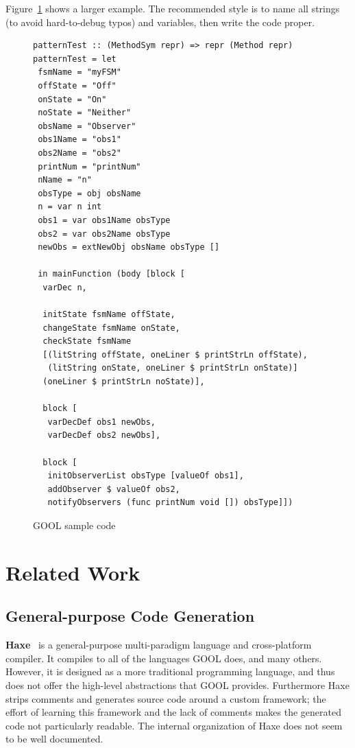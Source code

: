 \documentclass[sigplan,review,prologue,dvipsnames]{acmart}
\begin{document}
Figure~\ref{fig:code} shows a larger example.  The recommended style is
to name all strings (to avoid hard-to-debug typos) and variables, then
write the code proper.
\begin{figure}[tb]
\begin{lstlisting}
patternTest :: (MethodSym repr) => repr (Method repr)
patternTest = let 
 fsmName = "myFSM"
 offState = "Off"
 onState = "On"
 noState = "Neither"
 obsName = "Observer"
 obs1Name = "obs1"
 obs2Name = "obs2"
 printNum = "printNum"
 nName = "n"
 obsType = obj obsName
 n = var n int
 obs1 = var obs1Name obsType
 obs2 = var obs2Name obsType
 newObs = extNewObj obsName obsType []
   
 in mainFunction (body [block [
  varDec n,

  initState fsmName offState, 
  changeState fsmName onState,
  checkState fsmName 
  [(litString offState, oneLiner $ printStrLn offState), 
   (litString onState, oneLiner $ printStrLn onState)] 
  (oneLiner $ printStrLn noState)],

  block [
   varDecDef obs1 newObs, 
   varDecDef obs2 newObs],

  block [
   initObserverList obsType [valueOf obs1], 
   addObserver $ valueOf obs2,
   notifyObservers (func printNum void []) obsType]])
\end{lstlisting}
\caption{GOOL sample code}
\label{fig:code}
\end{figure}

\section{Related Work} \label{sec:related}

\subsection{General-purpose Code Generation}

\textbf{Haxe}~\cite{Haxe} is a general-purpose multi-paradigm language and cross-platform
compiler.  It compiles to all of the languages GOOL does, and many
others.  However, it is designed as a more traditional programming language, and
thus does not offer the high-level abstractions that GOOL provides. Furthermore
Haxe strips comments and generates source code around a custom framework; 
the effort of learning this framework and the lack of comments makes the generated
code not particularly readable. The internal organization of Haxe does not seem
to be well documented.
\end{document}
